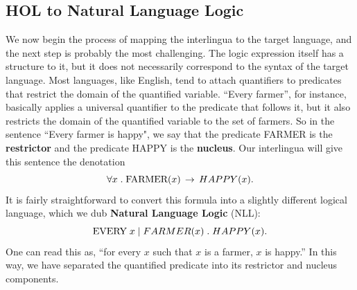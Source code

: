 \documentclass[11pt, oneside]{article}      %
\begin{document}
\subsection{HOL to Natural Language Logic}

We now begin the process of mapping the interlingua to the target language, and the next step is probably the most challenging.  The logic expression itself has a structure to it, but it does not necessarily correspond to the syntax of the target language.  Most languages, like English, tend to attach quantifiers to predicates that restrict the domain of the quantified variable.  ``Every farmer'', for instance, basically applies a universal quantifier to the predicate that follows it, but it also restricts the domain of the quantified variable to the set of farmers.  So in the sentence ``Every farmer is happy", we say that the predicate FARMER is the \textbf{restrictor} and the predicate HAPPY is the \textbf{nucleus}.  Our interlingua will give this sentence the denotation
$$
\forall x \; . \; \textnormal{FARMER}(x) \, \rightarrow \, HAPPY(x).
$$
It is fairly straightforward to convert this formula into a slightly different logical language, which we dub \textbf{Natural Language Logic} (NLL):
$$
\textnormal{EVERY} \; x \; | \; FARMER(x) \; . \; HAPPY(x).
$$
One can read this as, ``for every $x$ such that $x$ is a farmer, $x$ is happy.''  In this way, we have separated the quantified predicate into its restrictor and nucleus components.  
\end{document}
